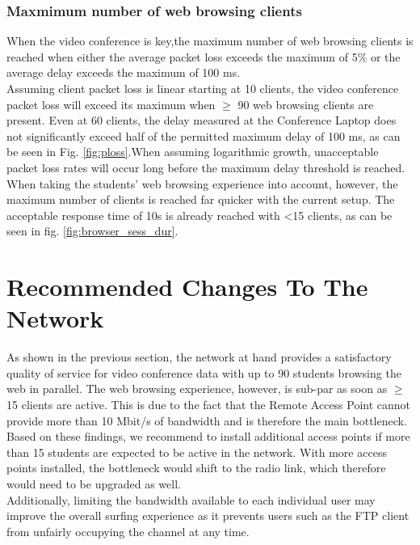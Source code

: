 \documentclass[
10pt, %
a4paper, %
oneside, %
headinclude,footinclude, %
BCOR5mm, %
]{scrartcl}
\begin{document}
\subsubsection{Maxmimum number of web browsing clients}
When the video conference is key,the maximum number of web browsing clients is reached when either the average packet loss exceeds the maximum of 5\% or the average delay exceeds the maximum of 100 ms.\\
Assuming client packet loss is linear starting at 10 clients, the video conference packet loss will exceed its maximum when $\geq$ 90 web browsing clients are present.
 Even at 60 clients, the delay measured at the Conference Laptop does not significantly exceed half of the permitted maximum delay of 100 ms, as can be seen in Fig. \ref{fig:ploss}.When assuming logarithmic growth, unacceptable packet loss rates will occur long before the maximum delay threshold is reached. \\

When taking the students' web browsing experience into account, however, the maximum number of clients is reached far quicker with the current setup. The acceptable response time of 10s is already reached with \textless 15 clients, as can be seen in fig. \ref{fig:browser_sess_dur}.%


\section{Recommended Changes To The Network}
As shown in the previous section, the network at hand provides a satisfactory quality of service for video conference data with up to 90 students browsing the web in parallel. The web browsing experience, however, is sub-par as soon as $\geq$ 15 clients are active. This is due to the fact that the Remote Access Point cannot provide more than 10 Mbit/s of bandwidth and is therefore the main bottleneck.\\
Based on these findings, we recommend to install additional access points if more than 15 students are expected to be active in the network. With more access points installed, the bottleneck would shift to the radio link, which therefore would need to be upgraded as well.\\
Additionally, limiting the bandwidth available to each individual user may improve the overall surfing experience as it prevents users such as the FTP client from unfairly occupying the channel at any time.
\end{document}
